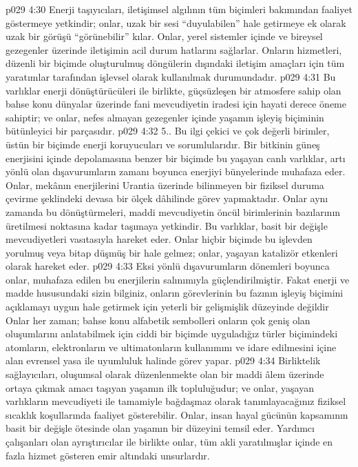 \vs p029 4:30 Enerji taşıyıcıları, iletişimsel algılının tüm biçimleri bakımından faaliyet göstermeye yetkindir; onlar, uzak bir sesi “duyulabilen” hale getirmeye ek olarak uzak bir görüşü “görünebilir” kılar. Onlar, yerel sistemler içinde ve bireysel gezegenler üzerinde iletişimin acil durum hatlarını sağlarlar. Onların hizmetleri, düzenli bir biçimde oluşturulmuş döngülerin dışındaki iletişim amaçları için tüm yaratımlar tarafından işlevsel olarak kullanılmak durumundadır.
\vs p029 4:31 Bu varlıklar enerji dönüştürücüleri ile birlikte, güçsüzleşen bir atmosfere sahip olan bahse konu dünyalar üzerinde fani mevcudiyetin iradesi için hayati derece öneme sahiptir; ve onlar, nefes almayan gezegenler içinde yaşamın işleyiş biçiminin bütünleyici bir parçasıdır.
\vs p029 4:32 5.\bibnobreakspace {}. Bu ilgi çekici ve çok değerli birimler, üstün bir biçimde enerji koruyucuları ve sorumlularıdır. Bir bitkinin güneş enerjisini içinde depolamasına benzer bir biçimde bu yaşayan canlı varlıklar, artı yönlü olan dışavurumların zamanı boyunca enerjiyi bünyelerinde muhafaza eder. Onlar, mekânın enerjilerini Urantia üzerinde bilinmeyen bir fiziksel duruma çevirme şeklindeki devasa bir ölçek dâhilinde görev yapmaktadır. Onlar aynı zamanda bu dönüştürmeleri, maddi mevcudiyetin öncül birimlerinin bazılarının üretilmesi noktasına kadar taşımaya yetkindir. Bu varlıklar, basit bir değişle mevcudiyetleri vasıtasıyla hareket eder. Onlar hiçbir biçimde bu işlevden yorulmuş veya bitap düşmüş bir hale gelmez; onlar, yaşayan katalizör etkenleri olarak hareket eder.
\vs p029 4:33 Eksi yönlü dışavurumların dönemleri boyunca onlar, muhafaza edilen bu enerjilerin salınımıyla güçlendirilmiştir. Fakat enerji ve madde hususundaki sizin bilginiz, onların görevlerinin bu fazının işleyiş biçimini açıklamayı uygun hale getirmek için yeterli bir gelişmişlik düzeyinde değildir Onlar her zaman; bahse konu alfabetik sembolleri onların çok geniş olan oluşumlarını anlatabilmek için ciddi bir biçimde uyguladığız türler biçimindeki atomların, elektronların ve ultimatonların kullanımını ve idare edilmesini içine alan evrensel yasa ile uyumluluk halinde görev yapar.
\vs p029 4:34 Birliktelik sağlayıcıları, oluşumsal olarak düzenlenmekte olan bir maddi âlem üzerinde ortaya çıkmak amacı taşıyan yaşamın ilk topluluğudur; ve onlar, yaşayan varlıkların mevcudiyeti ile tamamiyle bağdaşmaz olarak tanımlayacağınız fiziksel sıcaklık koşullarında faaliyet gösterebilir. Onlar, insan hayal gücünün kapsamının basit bir değişle ötesinde olan yaşamın bir düzeyini temsil eder. Yardımcı çalışanları olan ayrıştırıcılar ile birlikte onlar, tüm akli yaratılmışlar içinde en fazla hizmet gösteren emir altındaki unsurlardır.
